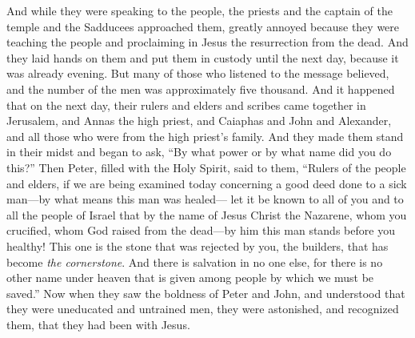 \begin{biblechapter} %
 And while they were speaking to the people, the priests and the captain of the temple and the Sadducees approached them,
\verse greatly annoyed because they were teaching the people and proclaiming in Jesus the resurrection from the dead.
\verse And they laid hands on them and put them in custody until the next day, because it was already evening.
\verse But many of those who listened to the message believed, and the number of the men was approximately five thousand.
 And it happened that on the next day, their rulers and elders and scribes came together in Jerusalem,
\verse and Annas the high priest, and Caiaphas and John and Alexander, and all those who were from the high priest’s family.
\verse And they made them stand in their midst and began to ask, “By what power or by what name did you do this?”
\verse Then Peter, filled with the Holy Spirit, said to them, “Rulers of the people and elders,
\verse if we are being examined today concerning a good deed done to a sick man—by what means this man was healed—
\verse let it be known to all of you and to all the people of Israel that by the name of Jesus Christ the Nazarene, whom you crucified, whom God raised from the dead—by him this man stands before you healthy!
\verse This one is the stone that was rejected by you, the builders, that has become \textit{the cornerstone}.
\verse And there is salvation in no one else, for there is no other name under heaven that is given among people by which we must be saved.”
\verse Now when they saw the boldness of Peter and John, and understood that they were uneducated and untrained men, they were astonished, and recognized them, that they had been with Jesus.

\end{biblechapter}
